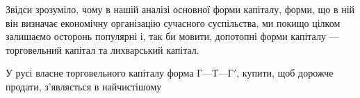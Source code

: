 Звідси зрозуміло, чому в нашій аналізі основної форми капіталу,
форми, що в ній він визначає економічну організацію сучасного
суспільства, ми покищо цілком залишаємо осторонь популярні
і, так би мовити, допотопні форми капіталу — торговельний
капітал та лихварський капітал.

У русі власне торговельного капіталу форма $Г — Т — Г'$,
купити, щоб дорожче продати, з’являється в найчистішому
\parbreak{}  %
